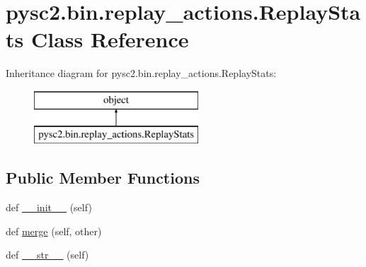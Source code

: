 \hypertarget{classpysc2_1_1bin_1_1replay__actions_1_1_replay_stats}{}\section{pysc2.\+bin.\+replay\+\_\+actions.\+Replay\+Stats Class Reference}
\label{classpysc2_1_1bin_1_1replay__actions_1_1_replay_stats}
Inheritance diagram for pysc2.\+bin.\+replay\+\_\+actions.\+Replay\+Stats\+:\begin{figure}[H]
\begin{center}
\leavevmode
\includegraphics[height=2.000000cm]{classpysc2_1_1bin_1_1replay__actions_1_1_replay_stats}
\end{center}
\end{figure}
\subsection*{Public Member Functions}
\begin{DoxyCompactItemize}
\item 
def \mbox{\hyperlink{classpysc2_1_1bin_1_1replay__actions_1_1_replay_stats_ab1aafbc6a5f11db453dd1e4b8a698403}{\+\_\+\+\_\+init\+\_\+\+\_\+}} (self)
\item 
def \mbox{\hyperlink{classpysc2_1_1bin_1_1replay__actions_1_1_replay_stats_abe193d5eba7267856df8fcd16d933c65}{merge}} (self, other)
\item 
def \mbox{\hyperlink{classpysc2_1_1bin_1_1replay__actions_1_1_replay_stats_aa96247c1aec6dc567cd1a3bd4e78138a}{\+\_\+\+\_\+str\+\_\+\+\_\+}} (self)
\end{DoxyCompactItemize}
